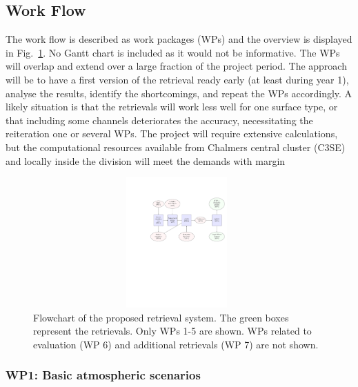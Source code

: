 \documentclass[12pt,oneside,a4paper]{article}
\begin{document}
\subsection{Work Flow}
\label{sec:wp}


The work flow is described as work packages (WPs) and the overview is displayed
in Fig.~\ref{fig:flowchart}. No Gantt chart is included as it would not be
informative. The WPs will overlap and extend over a large fraction of the project
period. The approach will be to have a first version of the retrieval ready early (at least during year 1), analyse the results, identify the shortcomings, and repeat the WPs accordingly. A likely situation is that the retrievals will work less well for one surface type, or that including some channels deteriorates the accuracy, necessitating the reiteration one or several WPs. The project will require extensive calculations, but
the computational resources available from Chalmers central cluster
(C3SE) and locally inside the division will meet the demands with margin

\begin{figure}
	\begin{minipage}[c]{0.75\textwidth}
		\includegraphics[trim=100 400 15 125,clip,height = 50mm, width=110mm]{flowchart.pdf}
	\end{minipage}\hfill
	\begin{minipage}[c]{0.24\textwidth}
		\caption{Flowchart of the proposed retrieval system. The green boxes
          represent the retrievals. Only WPs 1-5 are shown. WPs related to evaluation (WP 6) and additional retrievals (WP 7) are not shown.
		} \label{fig:flowchart}
	\end{minipage}
\end{figure}

\vspace{-1ex}
\subsubsection*{WP1: Basic atmospheric scenarios}
%
\end{document}
